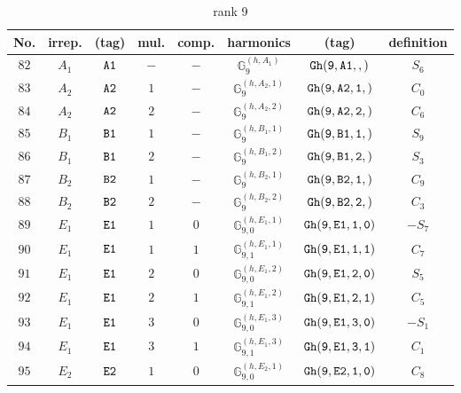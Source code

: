 \documentclass[fleqn,8pt]{jsarticle}
\begin{document}
\begin{table}[ht!]
\begin{center}
\caption{rank 9}
\renewcommand{\arraystretch}{1.3}
\begin{tabular}{cccccccc} \hline \hline
No. & irrep. & (tag) & mul. & comp. & harmonics & (tag) & definition \\ \hline
$ 82 $ & $ A_{1} $ & $ {\tt A1} $ & $ - $ & $ - $ & $ \mathbb{G}_{9}^{(h,A_{1})} $ & $ {\tt Gh(9,A1,,)} $ & $ S_{6} $ \\
$ 83 $ & $ A_{2} $ & $ {\tt A2} $ & $ 1 $ & $ - $ & $ \mathbb{G}_{9}^{(h,A_{2},1)} $ & $ {\tt Gh(9,A2,1,)} $ & $ C_{0} $ \\
$ 84 $ & $ A_{2} $ & $ {\tt A2} $ & $ 2 $ & $ - $ & $ \mathbb{G}_{9}^{(h,A_{2},2)} $ & $ {\tt Gh(9,A2,2,)} $ & $ C_{6} $ \\
$ 85 $ & $ B_{1} $ & $ {\tt B1} $ & $ 1 $ & $ - $ & $ \mathbb{G}_{9}^{(h,B_{1},1)} $ & $ {\tt Gh(9,B1,1,)} $ & $ S_{9} $ \\
$ 86 $ & $ B_{1} $ & $ {\tt B1} $ & $ 2 $ & $ - $ & $ \mathbb{G}_{9}^{(h,B_{1},2)} $ & $ {\tt Gh(9,B1,2,)} $ & $ S_{3} $ \\
$ 87 $ & $ B_{2} $ & $ {\tt B2} $ & $ 1 $ & $ - $ & $ \mathbb{G}_{9}^{(h,B_{2},1)} $ & $ {\tt Gh(9,B2,1,)} $ & $ C_{9} $ \\
$ 88 $ & $ B_{2} $ & $ {\tt B2} $ & $ 2 $ & $ - $ & $ \mathbb{G}_{9}^{(h,B_{2},2)} $ & $ {\tt Gh(9,B2,2,)} $ & $ C_{3} $ \\
$ 89 $ & $ E_{1} $ & $ {\tt E1} $ & $ 1 $ & $ 0 $ & $ \mathbb{G}_{9,0}^{(h,E_{1},1)} $ & $ {\tt Gh(9,E1,1,0)} $ & $ - S_{7} $ \\
$ 90 $ & $ E_{1} $ & $ {\tt E1} $ & $ 1 $ & $ 1 $ & $ \mathbb{G}_{9,1}^{(h,E_{1},1)} $ & $ {\tt Gh(9,E1,1,1)} $ & $ C_{7} $ \\
$ 91 $ & $ E_{1} $ & $ {\tt E1} $ & $ 2 $ & $ 0 $ & $ \mathbb{G}_{9,0}^{(h,E_{1},2)} $ & $ {\tt Gh(9,E1,2,0)} $ & $ S_{5} $ \\
$ 92 $ & $ E_{1} $ & $ {\tt E1} $ & $ 2 $ & $ 1 $ & $ \mathbb{G}_{9,1}^{(h,E_{1},2)} $ & $ {\tt Gh(9,E1,2,1)} $ & $ C_{5} $ \\
$ 93 $ & $ E_{1} $ & $ {\tt E1} $ & $ 3 $ & $ 0 $ & $ \mathbb{G}_{9,0}^{(h,E_{1},3)} $ & $ {\tt Gh(9,E1,3,0)} $ & $ - S_{1} $ \\
$ 94 $ & $ E_{1} $ & $ {\tt E1} $ & $ 3 $ & $ 1 $ & $ \mathbb{G}_{9,1}^{(h,E_{1},3)} $ & $ {\tt Gh(9,E1,3,1)} $ & $ C_{1} $ \\
$ 95 $ & $ E_{2} $ & $ {\tt E2} $ & $ 1 $ & $ 0 $ & $ \mathbb{G}_{9,0}^{(h,E_{2},1)} $ & $ {\tt Gh(9,E2,1,0)} $ & $ C_{8} $ \\

\end{tabular}
\end{center}
\end{table}
\end{document}
